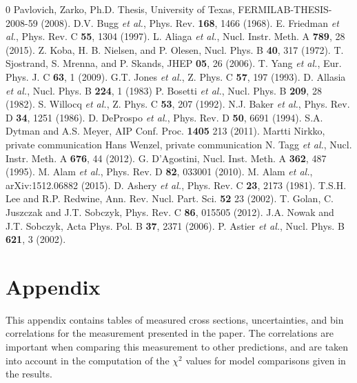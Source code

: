 \documentclass[aps,prl,preprint,showpacs,superscriptaddress,nofootinbib,floatfix,linenumbers]{revtex4}
\begin{document}
\begin{thebibliography}{0}
 Pavlovich, Zarko, Ph.D. Thesis, University of Texas, FERMILAB-THESIS-2008-59 (2008).
 D.V. Bugg \textit{et al.}, Phys. Rev. {\bf 168}, 1466 (1968).
 E. Friedman \textit{et al.}, Phys. Rev. C {\bf 55}, 1304 (1997).
 L. Aliaga \textit{et al.}, Nucl. Instr. Meth. A {\bf 789}, 28 (2015).
 Z. Koba, H. B. Nielsen, and P. Olesen, Nucl. Phys. B {\bf 40}, 317 (1972).
 T. Sjostrand, S. Mrenna, and P. Skands, JHEP {\bf 05}, 26 (2006).
 T. Yang \textit{et al.}, Eur. Phys. J. C {\bf 63}, 1 (2009).
 G.T. Jones \textit{et al.}, Z. Phys. C {\bf 57}, 197 (1993).
 D. Allasia \textit{et al.}, Nucl. Phys. B {\bf 224}, 1 (1983)
 P. Bosetti \textit{et al.}, Nucl. Phys. B {\bf 209}, 28 (1982).
 S. Willocq \textit{et al.}, Z. Phys. C {\bf 53}, 207 (1992).
 N.J. Baker \textit{et al.}, Phys. Rev. D {\bf 34}, 1251 (1986).
 D. DeProspo \textit{et al.}, Phys. Rev. D {\bf 50}, 6691 (1994).
 S.A. Dytman and A.S. Meyer, AIP Conf. Proc. {\bf 1405} 213 (2011).
 Martti Nirkko, private communication
 Hans Wenzel, private communication
 N. Tagg \textit{et al.}, Nucl. Instr. Meth. A {\bf 676}, 44 (2012).
 G. D'Agostini, Nucl. Inst. Meth. A {\bf 362}, 487 (1995).
 M. Alam \textit{et al.}, Phys. Rev. D {\bf 82}, 033001 (2010).
 M. Alam \textit{et al.}, arXiv:1512.06882 (2015).
 D. Ashery \textit{et al.}, Phys. Rev. C {\bf 23}, 2173 (1981).
 T.S.H. Lee and R.P. Redwine, Ann. Rev. Nucl. Part. Sci. {\bf 52} 23 (2002).
 T. Golan, C. Juszczak and J.T. Sobczyk, Phys. Rev. C {\bf 86}, 015505 (2012).
 J.A. Nowak and J.T. Sobczyk, Acta Phys. Pol. B {\bf 37}, 2371 (2006).
 P. Astier \textit{et al.}, Nucl. Phys. B {\bf 621}, 3 (2002).

\end{thebibliography}

\newpage
\section{Appendix}

This appendix contains tables of measured cross sections, uncertainties, and bin correlations for the measurement presented in the paper. The correlations are important when comparing this measurement to other predictions, and are taken into account in the computation of the $\chi^{2}$ values for model comparisons given in the results.
\end{document}
